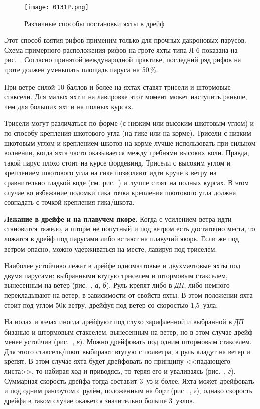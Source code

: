 \begin{figure*}[!htb]
  \centering{}
  \texttt{[image: 0131P.png]}
  \caption{Различные способы постановки яхты в дрейф}
  \label{fig:131}
\end{figure*}

Этот способ взятия рифов применим только для прочных дакроновых
парусов. Схема примерного расположения рифов на гроте яхты типа Л-6
показана на рис.~. Согласно принятой международной практике,
последний ряд рифов на гроте должен уменьшать площадь паруса на
50\,\%.

При ветре силой 10 баллов и более на яхтах ставят трисели и штормовые
стаксели. Для малых яхт и на лавировке этот момент может наступить
раньше, чем для больших яхт и на полных курсах.

Трисели могут различаться по форме (с низким или высоким шкотовым
углом) и по способу крепления шкотового угла (на гике или на
корме). Трисели с низким шкотовым углом и креплением шкотов на корме
лучше использовать при сильном волнении, когда яхта часто оказывается
между гребнями высоких волн. Правда, такой парус плохо стоит на курсе
фордевинд. Трисели с высоким углом и креплением шкотового угла на гике
позволяют идти круче к ветру на сравнительно гладкой воде
(см. рис.~) и лучше стоят на полных курсах. В этом случае во
избежание поломки гика точка крепления шкотового угла должна совпадать
с точкой крепления гика\-/шкота.

\textbf{Лежание в дрейфе и на плавучем
  якоре.} Когда с усилением ветра
идти становится тяжело, а шторм не попутный и под ветром есть
достаточно места, то ложатся в дрейф под парусами либо встают на
плавучий якорь. Если же под ветром опасно, можно удерживаться на
месте, лавируя под триселем.

Наиболее устойчиво лежат в дрейфе одномачтовые и двухмачтовые яхты под
двумя парусами: выбранными втугую триселем и штормовым стакселем,
вынесенным на ветер (рис.~, \textit{а}, \textit{б}). Руль
крепят либо в \textit{ДП}, либо немного перекладывают на ветер, в
зависимости от свойств яхты. В этом положении яхта стоит под углом
50\gr к ветру, дрейфуя под ветер со скоростью 1,5~узла.

На иолах и кэчах иногда дрейфуют под глухо зарифленной и выбранной в
\textit{ДП} бизанью и штормовым стакселем, вынесенным на ветер, но в
этом случае дрейф менее устойчив (рис.~, \textit{в}). Можно
дрейфовать под одним штормовым стакселем. Для этого стаксель\-/шкот
выбирают втугую с полветра, а руль кладут на ветер и крепят. В этом
случае яхта будет дрейфовать по принципу <<падающего листа>>, то
набирая ход и приводясь, то теряя его и уваливаясь (рис.~,
\textit{г}). Суммарная скорость дрейфа тогда составит 3~уз и
более. Яхта может дрейфовать и под одним рангоутом с рулём, положенным
на борт (рис.~, \textit{г}), однако скорость дрейфа в таком
случае окажется значительно больше 3~узлов.

